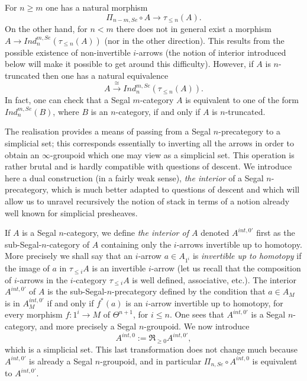 For $n\geq m$ one has a natural morphism
$$
\Pi _{n-m, Se}\circ A\rightarrow
\tau _{\leq
n}(A).
$$
On the other hand, for $n<m$ there does not in general exist a morphism
$A\rightarrow Ind ^{m,Se}_n(\tau _{\leq n}(A))$ (nor in the other direction).
This results from
the possible existence of non-invertible $i$-arrows (the notion of interior
introduced below
will make it possible to get around this difficulty).  However, if $A$ is
$n$-truncated then one has a natural equivalence
$$
A\stackrel{\cong}{\rightarrow} Ind ^{m,Se}_n(\tau _{\leq n}(A)).
$$
In fact, one can check that a Segal $m$-category
$A$ is equivalent to one of the form $Ind ^{m,Se}_n(B)$,
where $B$ is an $n$-category, if and only if $A$ is $n$-truncated.





The realisation provides a means of passing from a Segal $n$-precategory to a
simplicial set; this corresponds essentially to inverting all the
arrows in order to obtain an $\infty$-groupoid which one may view as a
simplicial set. This operation is rather brutal
and is hardly compatible
with questions of descent. We introduce here a dual construction (in a fairly
weak sense), {\em the interior} of a Segal $n$-precategory, which is much
better adapted to questions of descent and which will allow us
to unravel recursively the notion of stack in terms of a notion already well
known for simplicial presheaves.

If $A$ is a Segal $n$-category, we define {\em the interior of $A$}
denoted $A^{int, 0'}$ first as the sub-Segal-$n$-category of $A$
containing only the $i$-arrows invertible up to homotopy.
More precisely we shall say that an $i$-arrow $a\in A_{1^i}$ is {\em
invertible
up to homotopy} if the image of $a$ in $\tau _{\leq i}A$ is an
invertible $i$-arrow (let us recall that the composition of $i$-arrows in the
$i$-category $\tau _{\leq i}A$ is well defined, associative, etc.).
The interior $A^{int, 0'}$ of $A$ is the sub-Segal-$n$-precategory
defined by the
condition that $a\in A_M$ is in $A^{int,0'}_M$ if and only if
$f^{\ast}(a)$ is an $i$-arrow invertible up to homotopy, for
every morphism $f: 1^i\rightarrow M$ of $\Theta ^{n+1}$, for $i\leq n $.
One sees that $A^{int, 0'}$ is a Segal $n$-category, and
more precisely a
Segal $n$-groupoid.  We now introduce
$$
A^{int, 0}:= \Re _{\geq 0} A^{int, 0'},
$$
which is a simplicial set.
This last transformation does not change much because $A^{int, 0'}$
is already
a Segal $n$-groupoid, and in particular $\Pi _{n,Se}\circ A^{int,
0}$ is
equivalent to $A^{int, 0'}$.

